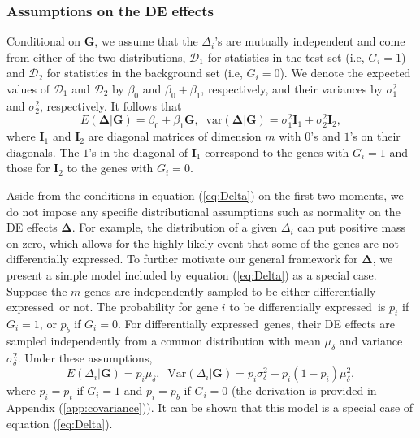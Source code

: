 \documentclass[a4,center,fleqn]{NAR}
\newcommand{\DED}{differentially expressed}
\begin{document}
	\subsubsection{Assumptions on the DE effects}\label{subsection:DeltaModel}
Conditional on $\bm G$, we assume that the $\Delta_i$'s are mutually independent and come from
either of the two distributions, $\mathscr{D}_1$ for statistics in the test set (i.e, $G_i = 
1$) and $\mathscr{D}_2$ for statistics in the background set (i.e, $G_i 
= 0$). We denote the expected values of $\mathscr{D}_1$ and $\mathscr{D}_2$ by $\beta_0$ 
and	$\beta_0+\beta_1$, respectively, and their variances by $\sigma_1^2$ and $\sigma_2^2$, 
respectively. It follows that 
\begin{equation}
\label{eq:Delta}
E(\bm \Delta|\bm G)=\beta_0 + \beta_1 \bm G,\;\; \mbox{var}(\bm \Delta|\bm G) = \sigma_1^2\bm
I_1+\sigma_2^2\bm I_2,
\end{equation} 
where $\bm I_1$ and $\bm I_2$ are diagonal matrices of dimension $m$ with $0$'s and $1$'s on 
their diagonals. The $1$'s in the diagonal of $\bm I_1$ correspond to the genes with $G_i=1$ 
and those for $\bm I_2$ to the genes with $G_i=0$.

Aside from the conditions in equation (\ref{eq:Delta}) on the first two moments, we do not 
impose any specific distributional assumptions such as normality on the DE effects $\bm 
\Delta$. For example, 
the distribution of a given $\Delta_i$ can put positive mass on zero, which allows for the 
highly likely event that some of the genes are not \DED. To further motivate our general 
framework for $\bm \Delta$, we present a simple model included by equation (\ref{eq:Delta}) as 
a special case. Suppose the $m$ genes are independently sampled to be either \DED~or not. The 
probability for gene $i$ to be \DED~is $p_t$ if $G_i=1$, or $p_b$ if $G_i=0$. For \DED~genes, 
their DE effects are sampled independently from a common distribution with mean $\mu_\delta$ 
and variance $\sigma^2_\delta$. Under these	assumptions, 
\begin{equation}
\label{eq:DeltaBinom}
E(\Delta_i|\bm G) = p_i\mu_{\delta},\;\; \text{Var}(\Delta_i|\bm G)= p_i\sigma_{\delta}^2 +
p_i(1-p_i)\mu_{\delta}^2,
\end{equation}
where $p_i=p_{t}$ if $G_i=1$ and $p_i=p_{b}$ if $G_i=0$ (the derivation is provided in Appendix 
(\ref{app:covariance})). It can be shown that this model is a special case of equation 
(\ref{eq:Delta}).

	
\end{document}
